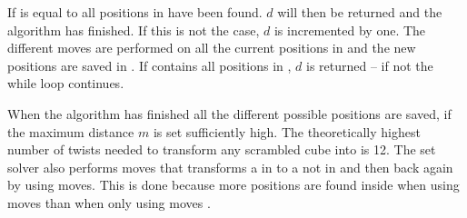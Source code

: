 If  is equal to  all positions in  have been found. $d$  will then be returned and the algorithm has finished. 
If this is not the case, $d$ is incremented by one. 
The different  moves are performed on all the current  positions in  and the new  positions are saved in .
If  contains all positions in , $d$ is returned -- if not the while loop continues.

When the algorithm has finished all the different possible  positions are saved, if the maximum distance $m$ is set sufficiently high. 
The theoretically highest number of twists needed to transform any scrambled cube into  is 12. %
The set solver also performs moves that transforms a \cube{} in  to a \cube{} not in  and then back again by using  moves. This is done because more positions are found inside  when using  moves than when only using  moves \cite{rokicki09}.
